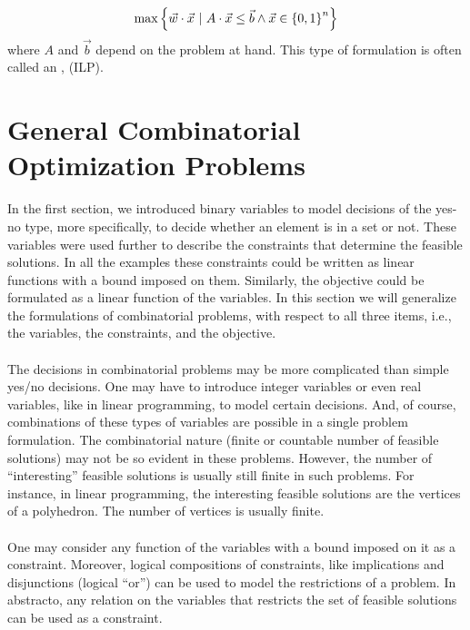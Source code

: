 \begin{equation}
\max\left\{ \vec{w}\cdot\vec{x}\ |\ A\cdot\vec{x}\leq\vec{b}\wedge \vec{x}\in\left\{ 0,1 \right\}^n \right\}
\end{equation}
where $A$ and $\vec{b}$ depend on the problem at hand. This type of formulation is often called an , (ILP).

\section{General Combinatorial Optimization Problems}

In the first section, we introduced binary variables to model decisions of the yes-no type, more specifically, to decide whether an element is in a set or not. These variables were used further to describe the constraints that determine the feasible solutions. In all the examples these constraints could be written as linear functions with a bound imposed on them. Similarly, the objective could be formulated as a linear function of the variables. In this section we will generalize the formulations of combinatorial problems, with respect to all three items, i.e., the variables, the constraints, and the objective.

\paragraph{}
The decisions in combinatorial problems may be more complicated than simple yes/no decisions. One may have to introduce integer variables or even real variables, like in linear programming, to model certain decisions. And, of course, combinations of these types of variables are possible in a single problem formulation. The combinatorial nature (finite or countable number of feasible solutions) may not be so evident in these problems. However, the number of ``interesting'' feasible solutions is usually still finite in such problems. For instance, in linear programming, the interesting feasible solutions are the vertices
of a polyhedron. The number of vertices is usually finite.

\paragraph{}
One may consider any function of the variables with a bound imposed on it as a constraint. Moreover, logical compositions of constraints, like implications and disjunctions (logical ``or'') can be used to model
the restrictions of a problem. In abstracto, any relation on the variables that restricts the set of feasible solutions can be used as a constraint.

